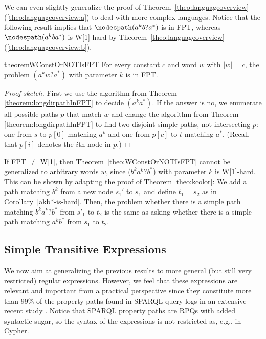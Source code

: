 \documentclass[a4paper,english]{lipics-v2016}
\theoremstyle{plain}
\begin{document}
We can even slightly generalize the proof of
Theorem~\ref{theo:languageoverview}(\ref{theo:languageoverview:a}) to deal with more complex
languages. Notice that the following result implies that $\nodespath(a^k b? a^*)$ is in
FPT, whereas $\nodespath(a^k b a^*)$ is W[1]-hard by Theorem~\ref{theo:languageoverview}(\ref{theo:languageoverview:b}).
\begin{restatable}{theorem}{WConstOrNOTIsFPT} \label{theo:WConstOrNOTIsFPT}
  For every constant $c$ and word $w$ with $|w|=c$, the problem
  \nodespath$(a^kw?a^*)$ with parameter $k$ is in FPT. 
\end{restatable}
\begin{proof}[Proof sketch]
  First we use the algorithm from Theorem
  \ref{theorem:longdirpathInFPT} to decide \nodesimpath$(a^ka^*)$. If the
  answer is no, we enumerate all possible paths $p$ that match $w$
  and change the algorithm from Theorem \ref{theorem:longdirpathInFPT}
  to find two disjoint simple paths, not intersecting $p$: one from $s$ to $p[0]$ matching
  $a^k$ and one from $p[c]$ to $t$ matching $a^*$. (Recall that
  $p[i]$ denotes the $i$th node in $p$.)
\end{proof}
If FPT $\neq$ W[1], then Theorem~\ref{theo:WConstOrNOTIsFPT} cannot be generalized to
arbitrary words $w$, since \nodesimpath($b^ka^k?b^*$) with parameter $k$
is W[1]-hard. This can be shown by adapting the proof of Theorem
\ref{theo:kcolor}: We add a path matching $b^k$ from a new node
$s_1'$ to $s_1$ and define $t_1 = s_2$ as in Corollary~\ref{akb*-is-hard}.
Then, the problem whether
there is a simple path matching $b^ka^k?b^*$ from $s'_1$ to $t_2$ is the
same as asking whether there is a simple path matching $a^k b^*$
from $s_1$ to $t_2$.

\subsection{Simple Transitive Expressions}\label{sec:blocklanguages} We now aim at generalizing
the previous results to more general (but still very restricted) regular
expressions. However, we feel that these expressions are relevant and
important from a practical perspective since they constitute more than
$99\%$ of the property paths   found in SPARQL query logs in an extensive
recent study \cite{BonifatiMT-corr17}. Notice that SPARQL property
paths are RPQs with added syntactic sugar, so the syntax of the
expressions is not restricted as, e.g., in Cypher.
\end{document}
